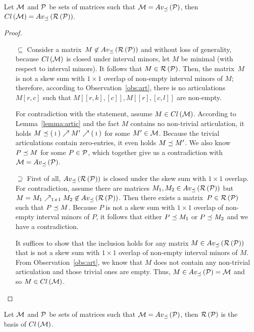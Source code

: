 \begin{thm}
\label{thm:basis}
Let $\mathcal{M}$ and $\mathcal{P}$ be sets of matrices such that $\mathcal{M}=Av_{\preceq}\left(\mathcal{P}\right)$, then $Cl\left(\mathcal{M}\right)=Av_{\preceq}\left(\mathcal{R}\left(\mathcal{P}\right)\right)$.
\end{thm}
\begin{proof}
\begin{itemize}
	\item[$\subseteq$] Consider a matrix~$M\not\in Av_{\preceq}\left(\mathcal{R}\left(\mathcal{P}\right)\right)$ and without loss of generality, because $Cl\left(\mathcal{M}\right)$ is closed under interval minors, let $M$ be minimal (with respect to interval minors). It follows that $M\in\mathcal{R}\left(\mathcal{P}\right)$. Then, the matrix~$M$ is not a skew sum with $1\times1$ overlap of non-empty interval minors of $M$; therefore, according to Observation~\ref{obs:art}, there is no articulations $M[r,c]$ such that $M[[r,k],[c]],M[[r],[c,l]]$ are non-empty.
	
	For contradiction with the statement, assume $M\in Cl\left(\mathcal{M}\right)$. According to Lemma~\ref{lemma:artic} and the fact $M$ contains no non-trivial articulation, it holds $M\preceq\left(\begin{smallmatrix}1\end{smallmatrix}\right)\nearrow M'\nearrow\left(\begin{smallmatrix}1\end{smallmatrix}\right)$ for some $M'\in\mathcal{M}$. Because the trivial articulations contain zero-entries, it even holds $M\preceq M'$. We also know $P\preceq M$ for some $P\in\mathcal{P}$, which together give us a contradiction with $\mathcal{M}=Av_{\preceq}\left(\mathcal{P}\right)$.
	\item[$\supseteq$] First of all, $Av_{\preceq}\left(\mathcal{R}\left(\mathcal{P}\right)\right)$ is closed under the skew sum with $1\times1$ overlap. For contradiction, assume there are matrices $M_1,M_2\in Av_{\preceq}\left(\mathcal{R}\left(\mathcal{P}\right)\right)$ but $M=M_1\nearrow_{1\times1}M_2\not\in Av_{\preceq}\left(\mathcal{R}\left(\mathcal{P}\right)\right)$. Then there exists a matrix~$P\in\mathcal{R}\left(\mathcal{P}\right)$ such that $P\preceq M$. Because $P$ is not a skew sum with $1\times1$ overlap of non-empty interval minors of $P$, it follows that either $P\preceq M_1$ or $P\preceq M_2$ and we have a contradiction.

It suffices to show that the inclusion holds for any matrix $M\in Av_{\preceq}\left(\mathcal{R}\left(\mathcal{P}\right)\right)$ that is not a skew sum with $1\times1$ overlap of non-empty interval minors of $M$. From Observation~\ref{obs:art}, we know that $M$ does not contain any non-trivial articulation and those trivial ones are empty. Thus, $M\in Av_{\preceq}\left(\mathcal{P}\right)=\mathcal{M}$ and so $M\in Cl\left(\mathcal{M}\right)$. \qedhere
\end{itemize}
\end{proof}

\begin{cor}
Let $\mathcal{M}$ and $\mathcal{P}$ be sets of matrices such that $\mathcal{M}=Av_{\preceq}\left(\mathcal{P}\right)$, then $\mathcal{R}\left(\mathcal{P}\right)$ is the basis of $Cl\left(\mathcal{M}\right)$.
\end{cor}

